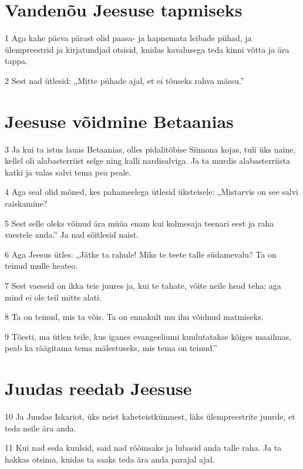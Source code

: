 \section*{Vandenõu Jeesuse tapmiseks}

\par 1 Aga kahe päeva pärast olid paasa- ja hapnemata leibade pühad, ja ülempreestrid ja kirjatundjad otsisid, kuidas kavalusega teda kinni võtta ja ära tappa.
\par 2 Sest nad ütlesid: „Mitte pühade ajal, et ei tõuseks rahva mässu.”

\section*{Jeesuse võidmine Betaanias}

\par 3 Ja kui ta istus lauas Betaanias, olles pidalitõbise Siimona kojas, tuli üks naine, kellel oli alabasterriist selge ning kalli nardisalviga. Ja ta murdis alabasterriista katki ja valas salvi tema pea peale.
\par 4 Aga seal olid mõned, kes pahameelega ütlesid üksteisele: „Mistarvis on see salvi raiskamine?
\par 5 Sest selle oleks võinud ära müüa enam kui kolmesaja teenari eest ja raha vaestele anda.” Ja nad sõitlesid naist.
\par 6 Aga Jeesus ütles: „Jätke ta rahule! Miks te teete talle südamevalu? Ta on teinud mulle heateo.
\par 7 Sest vaeseid on ikka teie juures ja, kui te tahate, võite neile head teha; aga mind ei ole teil mitte alati.
\par 8 Ta on teinud, mis ta võis. Ta on ennakult mu ihu võidnud matmiseks.
\par 9 Tõesti, ma ütlen teile, kus iganes evangeeliumi kuulutatakse kõiges maailmas, peab ka räägitama tema mälestuseks, mis tema on teinud.”

\section*{Juudas reedab Jeesuse}

\par 10 Ja Juudas Iskariot, üks neist kaheteistkümnest, läks ülempreestrite juurde, et teda neile ära anda.
\par 11 Kui nad seda kuulsid, said nad rõõmsaks ja lubasid anda talle raha. Ja ta hakkas otsima, kuidas ta saaks teda ära anda parajal ajal.

